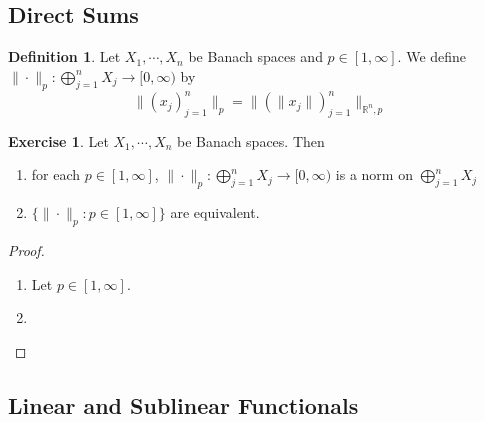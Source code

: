 \documentclass[12pt]{amsart}
\theoremstyle{definition}
\newtheorem{defn}[definition]{Definition}
\theoremstyle{remark}
\theoremstyle{definition}
\newtheorem{ex}[definition]{Exercise}
\newcommand{\R}{\mathbb{R}}
\newcommand{\Rg}{[0,\infty)}
\begin{document}
	
	
	\subsection{Direct Sums}
	
	\begin{defn}
	Let $X_1, \cdots, X_n$ be Banach spaces and $p \in [1, \infty]$. We define $\| \cdot \|_p : \bigoplus\limits_{j=1}^n X_j \rightarrow \Rg$ by $$\|(x_j)_{j=1}^n\|_p = \|(\|x_j\|)_{j=1}^n \|_{\R^n, p}$$
	\end{defn}
	
	\begin{ex}	
	Let $X_1, \cdots, X_n$ be Banach spaces. Then 
	\begin{enumerate}
	\item for each $p \in [1, \infty]$, $\|\cdot\|_p:\bigoplus\limits_{j=1}^n X_j \rightarrow \Rg$ is a norm on $\bigoplus\limits_{j=1}^n X_j$
	\item  $\{\|\cdot \|_p:  p \in [1, \infty]\}$ are equivalent. 
	\end{enumerate}
	\end{ex}
	
	\begin{proof}\
	\begin{enumerate}
	\item Let $p \in [1, \infty]$.
	\item 
	\end{enumerate}
\end{proof}		


	
	
	










	\newpage
	
	
	
	
	
	
	
	
	
	
	
	
	
	
	
	

	

	
	\subsection{Linear and Sublinear Functionals}
	
\end{document}
